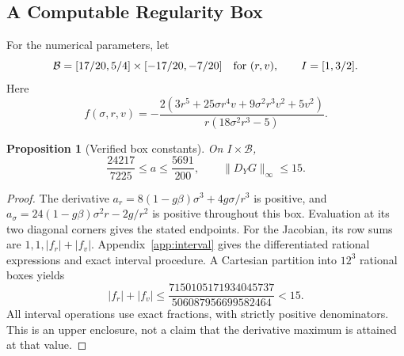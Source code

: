 \documentclass[11pt,a4paper]{article}
\newtheorem{proposition}[theorem]{Proposition}
\theoremstyle{definition}
\theoremstyle{remark}
\begin{document}
\subsection{A Computable Regularity Box}
For the numerical parameters, let
\begin{equation}
\mathcal B=[17/20,5/4]\times[-17/20,-7/20]
\quad\hbox{for }(r,v),\qquad I=[1,3/2].
\label{eq:box}
\end{equation}
Here
\begin{equation}
f(\sigma,r,v)=
-\frac{2(3r^5+25\sigma r^4v+9\sigma^2r^3v^2+5v^2)}
{r(18\sigma^2r^3-5)}.
\label{eq:rationalf}
\end{equation}

\begin{proposition}[Verified box constants]\label{prop:box}
On $I\times\mathcal B$,
\[
\frac{24217}{7225}\le a\le\frac{5691}{200},\qquad
\|D_YG\|_\infty\le15.
\]
\end{proposition}
\begin{proof}
The derivative $a_r=8(1-g\beta)\sigma^3+4g\sigma/r^3$ is positive, and
$a_\sigma=24(1-g\beta)\sigma^2r-2g/r^2$ is positive throughout this box.
Evaluation at its two diagonal corners gives the stated endpoints.
For the Jacobian, its row sums are $1,1,|f_r|+|f_v|$.
Appendix~\ref{app:interval} gives the differentiated rational expressions and exact interval procedure. A Cartesian partition into $12^3$ rational boxes yields
\[
|f_r|+|f_v|
\le\frac{7150105171934045737}{506087956699582464}
<15.
\]
All interval operations use exact fractions, with strictly positive denominators. This is an upper enclosure, not a claim that the derivative maximum is attained at that value.
\end{proof}
\end{document}

